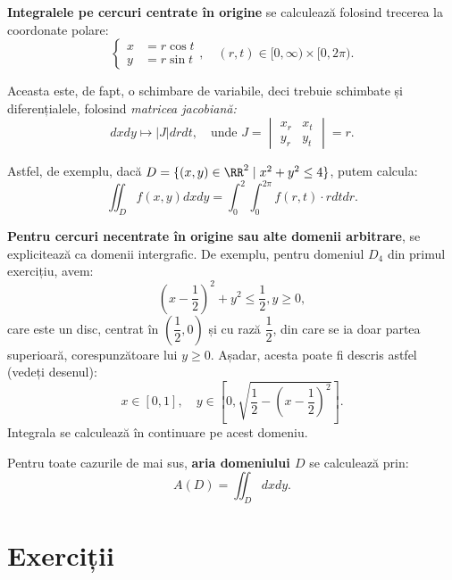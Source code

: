 \textbf{Integralele pe cercuri centrate în origine} se calculează folosind
trecerea la coordonate polare:
\[
    \begin{cases}
        x &= r \cos t \\
        y &= r \sin t
    \end{cases}, \quad (r, t) \in [0, \infty) \times [0, 2\pi).
\]

Aceasta este, de fapt, o schimbare de variabile, deci trebuie schimbate și
diferențialele, folosind \emph{matricea jacobiană:}
\[
    dxdy \mapsto |J|drdt, \quad \text{unde } %
    J = \begin{vmatrix}
        x_r & x_t \\
        y_r & y_t
    \end{vmatrix} = r.
\]

Astfel, de exemplu, dacă $ D = \{ (x, y) \in \RR^2 \mid x^2 + y^2 \leq 4 \} $,
putem calcula:
\[
    \iint_D f(x, y) dxdy = \int_0^2 \int_0^{2 \pi} f(r, t) \cdot r dtdr.
\]

\textbf{Pentru cercuri necentrate în origine sau alte domenii arbitrare},
se explicitează ca domenii intergrafic. De exemplu, pentru domeniul $ D_4 $
din primul exercițiu, avem:
\[
    \left( x - \dfrac{1}{2} \right)^2 + y^2 \leq \dfrac{1}{2}, y \geq 0,
\]
care este un disc, centrat în $ \left( \dfrac{1}{2}, 0 \right) $ și cu
rază $ \dfrac{1}{2} $, din care se ia doar partea superioară, corespunzătoare
lui $ y \geq 0 $. Așadar, acesta poate fi descris astfel (vedeți desenul):
\[
    x \in [0, 1], \quad y \in \left[0, \sqrt{\dfrac{1}{2} - (x - \dfrac{1}{2})^2}\right].
\]
Integrala se calculează în continuare pe acest domeniu.

\vspace{0.5cm}

Pentru toate cazurile de mai sus, \textbf{aria domeniului $ D $} se calculează
prin:
\[
    A(D) = \iint_D dxdy.
\]

\section{Exerciții}

